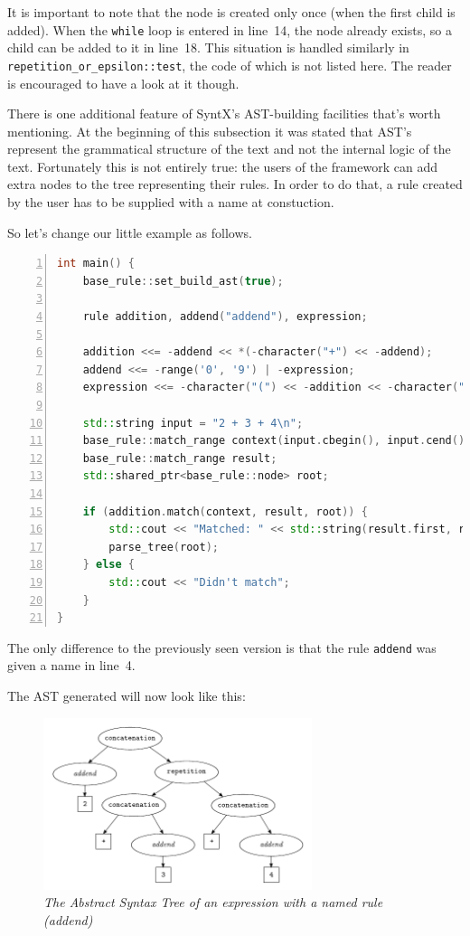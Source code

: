 \documentclass[12pt]{article}
\begin{document}
It is important to note that the node is created only once (when the first child is added). When the
\texttt{while} loop is entered in line~14, the node already exists, so a child can be added to it in line~18.
This situation is handled similarly in \texttt{repetition\_or\_epsilon::test}, the code of which is not listed
here. The reader is encouraged to have a look at it though.

There is one additional feature of SyntX's AST-building facilities that's worth mentioning. At the beginning
of this subsection it was stated that AST's represent the grammatical structure of the text and not the
internal logic of the text. Fortunately this is not entirely true: the users of the framework can add extra
nodes to the tree representing their rules. In order to do that, a rule created by the user has to be supplied
with a name at constuction.

So let's change our little example as follows.

\begin{center}
	\begin{minipage}[ht]{0.85\textwidth}
		\begin{lstlisting}[language=C++, breaklines=true, numbers=left]
int main() {
	base_rule::set_build_ast(true);

	rule addition, addend("addend"), expression;

	addition <<= -addend << *(-character("+") << -addend);
	addend <<= -range('0', '9') | -expression;
	expression <<= -character("(") << -addition << -character(")");

	std::string input = "2 + 3 + 4\n";
	base_rule::match_range context(input.cbegin(), input.cend());
	base_rule::match_range result;
	std::shared_ptr<base_rule::node> root;

	if (addition.match(context, result, root)) {
		std::cout << "Matched: " << std::string(result.first, result.second);
		parse_tree(root);
	} else {
		std::cout << "Didn't match";
	}
}
		\end{lstlisting}
	\end{minipage}
\end{center}

The only difference to the previously seen version is that the rule \texttt{addend} was given a name in
line~4.

The AST generated will now look like this:

\begin{figure}[h!]
	\centering
		\includegraphics[width=0.7\textwidth]{ast_named_rule}
		\caption{\emph{The Abstract Syntax Tree of an expression with a named rule (addend)}}
		\label{fig:ast}
\end{figure}
\end{document}
